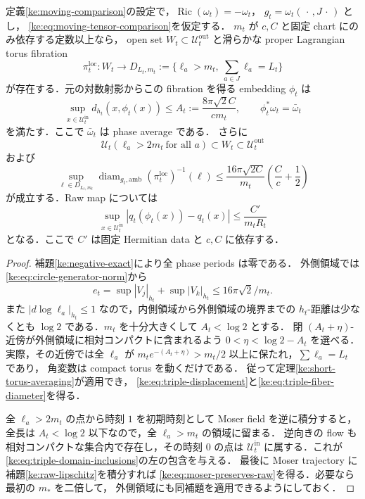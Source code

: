 \begin{theorem}
\label{ke:triple-moving-fibration}
定義\ref{ke:moving-comparison}の設定で，$\operatorname{Ric}(\omega_t)=-\omega_t$，
$g_t=\omega_t(\,\cdot\,,J\,\cdot\,)$ とし，
\eqref{ke:eq:moving-tensor-comparison}を仮定する．
$m_t$ が $c,C$ と固定 chart にのみ依存する定数以上なら，
open set $W_t\subset\mathcal U_t^{\mathrm{out}}$ と滑らかな proper Lagrangian torus fibration
\[
 \pi_t^{\mathrm{loc}}:W_t\longrightarrow
 D_{L_t,m_t}:=\{\ell_a>m_t,\ \sum_{a\in J}\ell_a=L_t\}
\]
が存在する．元の対数射影からこの fibration を得る embedding $\phi_t$ は
\begin{equation}\label{ke:eq:triple-displacement}
 \sup_{x\in\mathcal U_t^{\mathrm{in}}}d_{h_t}(x,\phi_t(x))
 \le A_t:=\frac{8\pi\sqrt2 C}{c m_t},
 \qquad \phi_t^*\omega_t=\bar\omega_t
\end{equation}
を満たす．ここで $\bar\omega_t$ は phase average である．
さらに
\begin{equation}\label{ke:eq:triple-domain-inclusions}
 \mathcal U_t(\ell_a>2m_t\ \text{for all }a)
 \subset W_t\subset\mathcal U_t^{\mathrm{out}}
\end{equation}
および
\begin{equation}\label{ke:eq:triple-fiber-diameter}
 \sup_{\ell\in D_{L_t,m_t}}
 \operatorname{diam}_{g_t,\mathrm{amb}}
 (\pi_t^{\mathrm{loc}})^{-1}(\ell)
 \le\frac{16\pi\sqrt{2C}}{m_t}
       \left(\frac Cc+\frac12\right)
\end{equation}
が成立する．Raw map については
\begin{equation}\label{ke:eq:moser-preserves-raw}
 \sup_{x\in\mathcal U_t^{\mathrm{in}}}
 |q_t(\phi_t(x))-q_t(x)|\le\frac{C'}{m_tR_t}
\end{equation}
となる．ここで $C'$ は固定 Hermitian data と $c,C$ に依存する．
\end{theorem}
\begin{proof}
補題\ref{ke:negative-exact}により全 phase periods は零である．
外側領域では\eqref{ke:eq:circle-generator-norm}から
\[
 e_t=\sup|V_j|_{h_t}+\sup|V_k|_{h_t}
 \le16\pi\sqrt2/m_t.
\]
また $|d\log\ell_a|_{h_t}\le1$ なので，内側領域から外側領域の境界までの
$h_t$-距離は少なくとも $\log2$ である．$m_t$ を十分大きくして $A_t<\log2$ とする．
閉 $(A_t+\eta)$-近傍が外側領域に相対コンパクトに含まれるよう
$0<\eta<\log2-A_t$ を選べる．実際，その近傍では全 $\ell_a$ が
$m_t e^{-(A_t+\eta)}>m_t/2$ 以上に保たれ，$\sum\ell_a=L_t$ であり，
角変数は compact torus を動くだけである．
従って定理\ref{ke:short-torus-averaging}が適用でき，
\eqref{ke:eq:triple-displacement}と\eqref{ke:eq:triple-fiber-diameter}を得る．

全 $\ell_a>2m_t$ の点から時刻 $1$ を初期時刻として Moser field を逆に積分すると，
全長は $A_t<\log2$ 以下なので，全 $\ell_a>m_t$ の領域に留まる．
逆向きの flow も相対コンパクトな集合内で存在し，その時刻 $0$ の点は
$\mathcal U_t^{\mathrm{in}}$ に属する．これが\eqref{ke:eq:triple-domain-inclusions}の左の包含を与える．
最後に Moser trajectory に補題\ref{ke:raw-lipschitz}を積分すれば
\eqref{ke:eq:moser-preserves-raw}を得る．必要なら最初の $m_*$ を二倍して，
外側領域にも同補題を適用できるようにしておく．
\end{proof}

